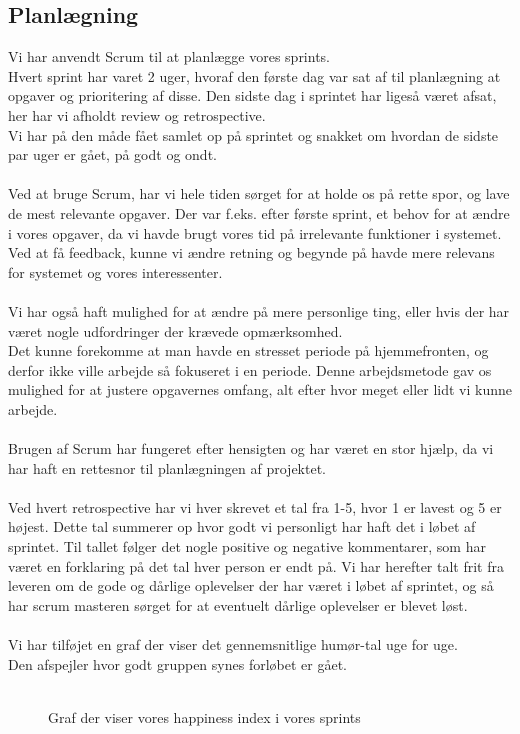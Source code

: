 \subsection{Planlægning}
Vi har anvendt Scrum til at planlægge vores sprints.
\\
Hvert sprint har varet 2 uger, hvoraf den første dag var sat af til planlægning at opgaver og prioritering af disse.
Den sidste dag i sprintet har ligeså været afsat, her har vi afholdt review og retrospective.
\\
Vi har på den måde fået samlet op på sprintet og snakket om hvordan de sidste par uger er gået, på godt og ondt.
\\\\
Ved at bruge Scrum, har vi hele tiden sørget for at holde os på rette spor, og lave de mest relevante opgaver.
Der var f.eks. efter første sprint, et behov for at ændre i vores opgaver, da vi havde brugt vores tid på irrelevante funktioner i systemet.
Ved at få feedback, kunne vi ændre retning og begynde på havde mere relevans for systemet og vores interessenter.
\\\\
Vi har også haft mulighed for at ændre på mere personlige ting, eller hvis der har været nogle udfordringer der krævede opmærksomhed.
\\
Det kunne forekomme at man havde en stresset periode på hjemmefronten, og derfor ikke ville arbejde så fokuseret i en periode.
Denne arbejdsmetode gav os mulighed for at justere opgavernes omfang, alt efter hvor meget eller lidt vi kunne arbejde.
\\\\
Brugen af Scrum har fungeret efter hensigten og har været en stor hjælp, da vi har haft en rettesnor til planlægningen af projektet.
\\\\
Ved hvert retrospective har vi hver skrevet et tal fra 1-5, hvor 1 er lavest og 5 er højest. Dette tal summerer op hvor godt vi personligt
har haft det i løbet af sprintet.
Til tallet følger det nogle positive og negative kommentarer, som har været en forklaring på det tal hver person er endt på.
Vi har herefter talt frit fra leveren om de gode og dårlige oplevelser der har været i løbet af sprintet, og så har scrum masteren sørget for at
eventuelt dårlige oplevelser er blevet løst.
\\\\
Vi har tilføjet en graf der viser det gennemsnitlige humør-tal uge for uge.
\\
Den afspejler hvor godt gruppen synes forløbet er gået.
\\\\
\begin{figure}[here]
    \caption{Graf der viser vores happiness index i vores sprints}
    \label{fig:happiness-graf}
\end{figure}

